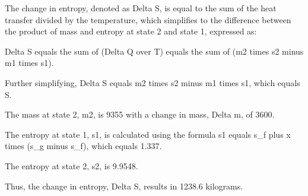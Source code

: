 The change in entropy, denoted as Delta S, is equal to the sum of the heat transfer divided by the temperature, which simplifies to the difference between the product of mass and entropy at state 2 and state 1, expressed as:

Delta S equals the sum of (Delta Q over T) equals the sum of (m2 times s2 minus m1 times s1).

Further simplifying, Delta S equals m2 times s2 minus m1 times s1, which equals S.

The mass at state 2, m2, is 9355 with a change in mass, Delta m, of 3600.

The entropy at state 1, s1, is calculated using the formula s1 equals s_f plus x times (s_g minus s_f), which equals 1.337.

The entropy at state 2, s2, is 9.9548.

Thus, the change in entropy, Delta S, results in 1238.6 kilograms.